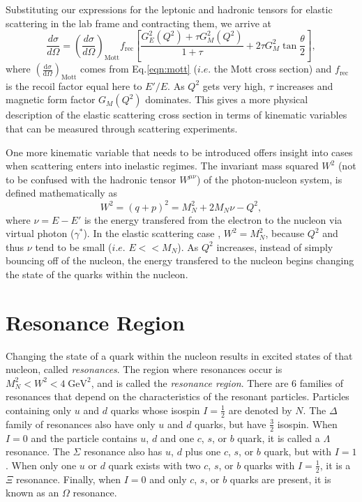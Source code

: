 Substituting our expressions for the leptonic and hadronic tensors for elastic scattering in the lab frame and contracting them, we arrive at
\begin{equation}
\label{eqn:el_cs}
\frac{d\sigma}{d\Omega} = \left( \frac{d\sigma}{d\Omega} \right)_{\mathrm{Mott}} f_{\mathrm{rec}} \left[ \frac{G_E^2(Q^2) + \tau G_M^2(Q^2)}{1+\tau} + 2\tau G_M^2 \tan \frac{\theta}{2} \right],
\end{equation}
where $\left( \tfrac{\mathrm{d}\sigma}{\mathrm{d}\Omega} \right)_{\mathrm{Mott}}$ comes from Eq.\ref{eqn:mott} ($i.e.$ the Mott cross section) and $f_{\mathrm{rec}}$ is the recoil factor equal here to $E'/E$. As $Q^2$ gets very high, $\tau$ increases and magnetic form factor $G_M(Q^2)$ dominates. This gives a more physical description of the elastic scattering cross section in terms of kinematic variables that can be measured through scattering experiments.

One more kinematic variable that needs to be introduced offers insight into cases when scattering enters into inelastic regimes. The invariant mass squared $W^2$ (not to be confused with the hadronic tensor $W^{\mu\nu}$) of the photon-nucleon system, is defined mathematically as 
\begin{equation}
W^2 = (q+p)^2 =M_N^2 + 2M_N\nu - Q^2,
\end{equation}
where $\nu = E-E'$ is the energy transfered from the electron to the nucleon via virtual photon ($\gamma^*$). In the elastic scattering case , $W^2 = M_N^2$, because $Q^2$ and thus $\nu$ tend to be small ($i.e.$ $E << M_N$). As $Q^2$ increases, instead of simply bouncing off of the nucleon, the energy transfered to the nucleon begins changing the state of the quarks within the nucleon. 

\section{Resonance Region}
Changing the state of a quark within the nucleon results in excited states of that nucleon, called \textit{resonances}. The region where resonances occur is $M_N^2 < W^2 < 4 \; \mathrm{GeV}^2$, and is called the \textit{resonance region}. There are 6 families of resonances that depend on the characteristics of the resonant particles. Particles containing only $u$ and $d$ quarks whose isospin $I= \tfrac{1}{2}$ are denoted by $N$. The $\Delta$ family of resonances also have only $u$ and $d$ quarks, but have $\tfrac{3}{2}$ isospin. When $I=0$ and the particle contains $u$, $d$ and one $c$, $s$, or $b$ quark, it is called a $\Lambda$ resonance. The $\Sigma$ resonance also has $u$, $d$ plus one $c$, $s$, or $b$ quark, but with $I=1$. When only one $u$ or $d$ quark exists with two $c$, $s$, or $b$ quarks with $I=\tfrac{1}{2}$, it is a $\Xi$ resonance. Finally, when $I=0$ and only $c$, $s$, or $b$ quarks are present, it is known as an $\Omega$ resonance.


